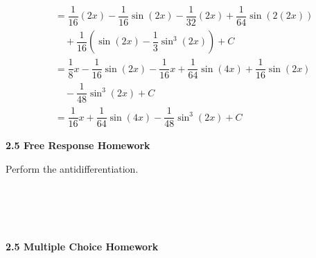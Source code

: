 \begin{tcolorbox}[solution]
\begin{align*}
        & = \dfrac{1}{16}(2x) - \dfrac{1}{16}\sin (2x) - \dfrac{1}{32}(2x) + \dfrac{1}{64}\sin (2(2x)) \\[5.5pt]
        & \quad + \dfrac{1}{16}\left(\sin(2x) - \dfrac{1}{3}\sin^3 (2x)\right) + C \\[11pt]
        & = \dfrac{1}{8}x - \dfrac{1}{16}\sin (2x) - \dfrac{1}{16}x + \dfrac{1}{64}\sin (4x) + \dfrac{1}{16}\sin (2x) \\[5.5pt]
        & \quad - \dfrac{1}{48}\sin^3 (2x) + C \\[11pt]
        & = \boxed{\dfrac{1}{16}x + \dfrac{1}{64}\sin (4x) - \dfrac{1}{48}\sin^3 (2x) + C}
    \end{align*}
\end{tcolorbox}

\newpage

\textbf{\large{2.5 Free Response Homework}} \par

Perform the antidifferentiation. \par

 \\[11pt]
 \\[11pt]
 \\[11pt]
 \\[11pt]

\textbf{\large{2.5 Multiple Choice Homework}} \par

